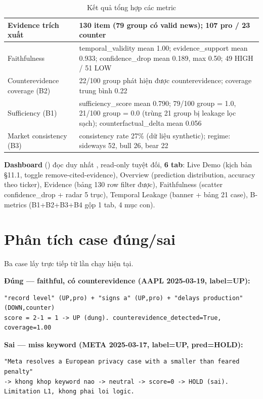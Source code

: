 \begin{table}[H]
\centering
\caption{Kết quả tổng hợp các metric}
\begin{tabularx}{\textwidth}{|X|X|}
\hline
Evidence trích xuất & 130 item (79 group có valid news); 107 pro / 23 counter \\ \hline
Faithfulness & temporal\_validity mean 1.00; evidence\_support mean 0.933; confidence\_drop mean 0.189, max 0.50; 49 HIGH / 51 LOW \\ \hline
Counterevidence coverage (B2) & 22/100 group phát hiện được counterevidence; coverage trung bình 0.22 \\ \hline
Sufficiency (B1) & sufficiency\_score mean 0.790; 79/100 group = 1.0, 21/100 group = 0.0 (trùng 21 group bị leakage lọc sạch); counterfactual\_delta mean 0.056 \\ \hline
Market consistency (B3) & consistency rate 27\% (dữ liệu synthetic); regime: sideways 52, bull 26, bear 22 \\ \hline
\end{tabularx}
\end{table}

\textbf{Dashboard} () đọc duy nhất , read-only tuyệt đối, \textbf{6 tab}: Live Demo (kịch bản §11.1, toggle remove-cited-evidence), Overview (prediction distribution, accuracy theo ticker), Evidence (bảng 130 row filter được), Faithfulness (scatter confidence\_drop + radar 5 trục), Temporal Leakage (banner + bảng 21 case), B-metrics (B1+B2+B3+B4 gộp 1 tab, 4 mục con).

\section{Phân tích case đúng/sai}

Ba case lấy trực tiếp từ  lần chạy hiện tại.

\textbf{Đúng — faithful, có counterevidence (AAPL 2025-03-19, label=UP):}
\begin{singlespace}
\begin{lstlisting}[numbers=none]
"record level" (UP,pro) + "signs a" (UP,pro) + "delays production" (DOWN,counter)
score = 2-1 = 1 -> UP (dung). counterevidence_detected=True, coverage=1.00
\end{lstlisting}
\end{singlespace}

\textbf{Sai — miss keyword (META 2025-03-17, label=UP, pred=HOLD):}
\begin{singlespace}
\begin{lstlisting}[numbers=none]
"Meta resolves a European privacy case with a smaller than feared penalty"
-> khong khop keyword nao -> neutral -> score=0 -> HOLD (sai). Limitation L1, khong phai loi logic.
\end{lstlisting}
\end{singlespace}

